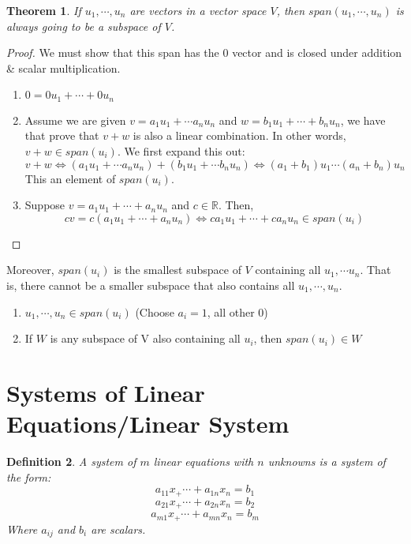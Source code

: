 \documentclass{article}
\newtheorem{theorem}{Theorem}[section]
\newtheorem{definition}[theorem]{Definition}
\newtheorem{one minute paper}[theorem]{One Minute Paper}
\begin{document}
\begin{theorem}
    If $u_1, \cdots, u_n$ are vectors in a vector space $V$, then $span(u_1,\cdots, u_n)$ is always going to be a subspace of $V$. 
\end{theorem}

\begin{proof}
    We must show that this span has the $0$ vector and is closed under addition \& scalar multiplication. 
    \begin{enumerate}
        \item $0 = 0u_1 + \cdots + 0u_n$
        \item Assume we are given $v = a_1u_1 + \cdots a_n u_n$ and $w = b_1u_1 + \cdots + b_n u_n$, we have that prove that $v + w$ is also a linear combination. In other words, $v + w \in span(u_i)$. We first expand this out:
        \begin{equation}
            v + w \iff (a_1u_1 + \cdots a_n u_n) + (b_1u_1 + \cdots b_n u_n) \iff (a_1 + b_1)u_1 \cdots (a_n + b_n)u_n
        \end{equation}
        This an element of $span(u_i)$. 
        \item Suppose $v = a_1 u_1 + \cdots + a_n u_n$ and $c \in \mathbb{R}$. Then, 
        \begin{equation}
            cv = c(a_1u_1 + \cdots + a_n u_n) \iff ca_1u_1 + \cdots + ca_nu_n \in span(u_i)
        \end{equation}
    \end{enumerate}
\end{proof}

Moreover, $span(u_i)$ is the smallest subspace of $V$ containing all $u_1, \cdots u_n$. That is, there cannot be a smaller subspace that also contains all $u_1, \cdots, u_n$. 
\begin{enumerate}
    \item $u_1, \cdots, u_n \in span(u_i)$ (Choose $a_i = 1$, all other $0$)
    \item If $W$ is any subspace of V also containing all $u_i$, then $span(u_i) \in W$
\end{enumerate}

\section*{Systems of Linear Equations/Linear System}

\begin{definition}
    A system of $m$ linear equations with $n$ unknowns is a system of the form:
    \begin{equation}
        a_{11}x_ + \cdots + a_{1n}x_n = b_1
    \end{equation}
    \begin{equation}
        a_{21}x_ + \cdots + a_{2n}x_n = b_2
    \end{equation}
    \begin{equation}
        a_{m1}x_ + \cdots + a_{mn}x_n = b_m
    \end{equation}
    Where $a_{ij}$ and $b_i$ are scalars.
\end{definition}
\end{document}
